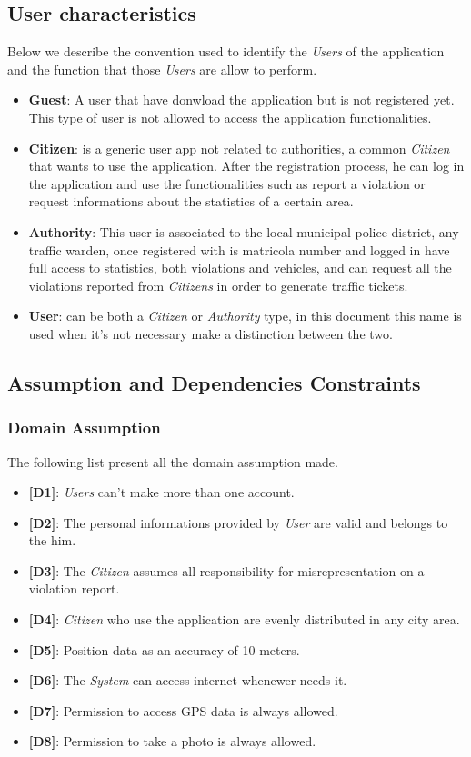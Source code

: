 \documentclass{article}
\begin{document}
\subsection{User characteristics}
Below we describe the convention used to identify the \textit{Users} of the application and the function that those 
\textit{Users} are allow to perform.
\begin{itemize}
    \item \textbf{Guest}: A user that have donwload the application but is not 
    registered yet. This type of user is not allowed to access 
    the application functionalities.
    \item \textbf{Citizen}: is a generic user app not related to authorities, a 
    common \textit{Citizen} that wants to use the application. After the registration process, he can 
    log in the application and use the functionalities such as report a violation or request 
    informations about the statistics of a certain area.
    \item \textbf{Authority}: This user is associated to the local municipal
    police district, any traffic warden, once registered with 
    is matricola number and logged in have full access to statistics, both violations and vehicles, and 
    can request all the violations reported from \textit{Citizens} in order to generate traffic tickets. 
    \item \textbf{User}: can be both a \textit{Citizen} or \textit{Authority} type, in this document
    this name is used when it's not necessary make a distinction 
    between the two.
\end{itemize}

\subsection{Assumption and Dependencies Constraints}
\subsubsection{Domain Assumption}
The following list present all the domain assumption made.
\begin{itemize}
    \item \textbf{[D1]}: \textit{Users} can't make more than one account.
    \item \textbf{[D2]}: The personal informations provided by \textit{User} are valid and belongs to the him. 
    \item \textbf{[D3]}: The \textit{Citizen} assumes all responsibility for misrepresentation on a violation report.
    \item \textbf{[D4]}: \textit{Citizen} who use the application are evenly distributed in any city area.
    \item \textbf{[D5]}: Position data as an accuracy of 10 meters.
    \item \textbf{[D6]}: The \textit{System} can access internet whenewer needs it.
    \item \textbf{[D7]}: Permission to access GPS data is always allowed.
    \item \textbf{[D8]}: Permission to take a photo is always allowed. 
\end{itemize}
\end{document}
